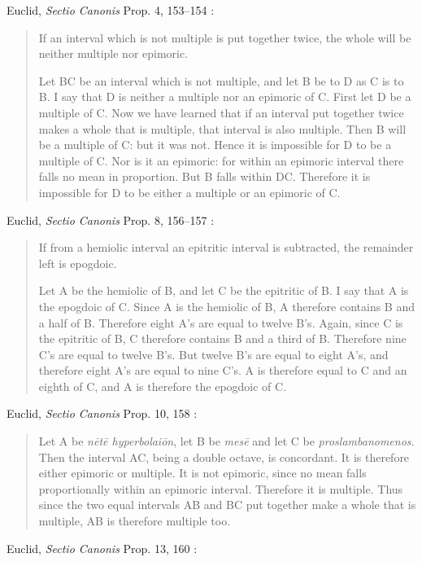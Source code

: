 \documentclass{amsart}
\theoremstyle{definition}
\begin{document}
Euclid, {\em Sectio Canonis} Prop. 4, 153--154 \cite[p.~196]{barker}:

\begin{quote}
If an interval which is not multiple is put together
twice, the whole will be neither multiple nor epimoric.

Let BC be an interval which is not multiple, and let B be to D as C is to B. I
say that D is neither a multiple nor an epimoric of C. First let D be a multiple
of C. Now we have learned that if an interval put together twice makes a whole
that is multiple, that interval is also multiple. Then B will be a multiple of C:
but it was not. Hence it is impossible for D to be a multiple of C. Nor is it an
epimoric: for within an epimoric interval there falls no mean in proportion.
But B falls within DC. Therefore it is impossible for D to be either a multiple
or an epimoric of C.
\end{quote}

Euclid, {\em Sectio Canonis} Prop. 8, 156--157 \cite[p.~198]{barker}:

\begin{quote}
If from a hemiolic interval an epitritic interval is
subtracted, the remainder left is epogdoic.

Let A be the hemiolic of B, and let C be the epitritic of B.
I say that A is the epogdoic of C. Since A is the hemiolic
of B, A therefore contains B and a half of B. Therefore
eight A's are equal to twelve B's. Again, since C is the
epitritic of B, C therefore contains B and a third of B.
Therefore nine C's are equal to twelve B's. But twelve B's
are equal to eight A's, and therefore eight A's are equal to
nine C's. A is therefore equal to C and an eighth of C, and
A is therefore the epogdoic of C.
\end{quote}

Euclid, {\em Sectio Canonis} Prop. 10, 158 \cite[p.~199]{barker}:

\begin{quote}
Let A be {\em n\={e}t\={e} hyperbolai\={o}n}, let B be {\em mes\={e}} and let C be {\em proslambanomenos}.
Then the interval AC, being a double octave, is concordant. It is therefore
either epimoric or multiple. It is not epimoric, since no mean falls
proportionally within an epimoric interval. Therefore it is multiple. Thus
since the two equal intervals AB and BC put together make a whole that is
multiple, AB is therefore multiple too.
\end{quote}

Euclid, {\em Sectio Canonis} Prop. 13, 160 \cite[p.~201]{barker}:
\end{document}
